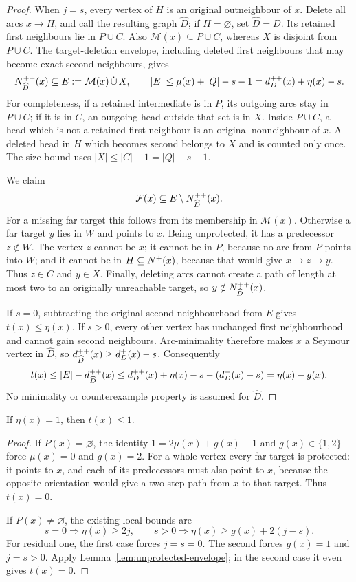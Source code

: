 \begin{proof}
When $j=s$, every vertex of $H$ is an original outneighbour of $x$.
Delete all arcs $x\to H$, and call the resulting graph $\widehat D$;
if $H=\varnothing$, set $\widehat D=D$. Its retained first neighbours
lie in $P\cup C$. Also
$\mathcal M(x)\subseteq P\cup C$, whereas $X$ is disjoint from $P\cup C$.
The target-deletion envelope, including deleted first neighbours that
may become exact second neighbours, gives
\[
 N^{++}_{\widehat D}(x)\subseteq
 E:=\mathcal M(x)\,\dot\cup\,X,
 \qquad
 |E|\le\mu(x)+|Q|-s-1
       =d^{++}_D(x)+\eta(x)-s.
\]
For completeness, if a retained intermediate is in $P$, its outgoing
arcs stay in $P\cup C$; if it is in $C$, an outgoing head outside that
set is in $X$. Inside $P\cup C$, a head which is not a retained first
neighbour is an original nonneighbour of $x$. A deleted head in $H$
which becomes second belongs to $X$ and is counted only once.
The size bound uses $|X|\le|C|-1=|Q|-s-1$.

We claim
\[
 \mathcal F(x)\subseteq E\setminus N^{++}_{\widehat D}(x).
\]
For a missing far target this follows from its membership in
$\mathcal M(x)$. Otherwise a far target $y$ lies in $W$ and points to
$x$. Being unprotected, it has a predecessor $z\notin W$.
The vertex $z$ cannot be $x$; it cannot be in $P$, because no arc from
$P$ points into $W$; and it cannot be in $H\subseteq N^+(x)$, because
that would give $x\to z\to y$. Thus $z\in C$ and $y\in X$.
Finally, deleting arcs cannot create a path of length at most two to
an originally unreachable target, so $y\notin N^{++}_{\widehat D}(x)$.

If $s=0$, subtracting the original second neighbourhood from $E$
gives $t(x)\le\eta(x)$. If $s>0$, every other vertex has unchanged
first neighbourhood and cannot gain second neighbours. Arc-minimality
therefore makes $x$ a Seymour vertex in $\widehat D$, so
$d^{++}_{\widehat D}(x)\ge d^+_D(x)-s$. Consequently
\[
 t(x)\le|E|-d^{++}_{\widehat D}(x)
 \le d^{++}_D(x)+\eta(x)-s-(d^+_D(x)-s)
 =\eta(x)-g(x).
\]
No minimality or counterexample property is assumed for $\widehat D$.
\end{proof}

\begin{corollary}\label{cor:eta-one-budget}
If $\eta(x)=1$, then $t(x)\le1$.
\end{corollary}
\begin{proof}
If $P(x)=\varnothing$, the identity
$1=2\mu(x)+g(x)-1$ and $g(x)\in\{1,2\}$ force
$\mu(x)=0$ and $g(x)=2$. For a whole vertex every far target is
protected: it points to $x$, and each of its predecessors must also
point to $x$, because the opposite orientation would give a two-step
path from $x$ to that target. Thus $t(x)=0$.

If $P(x)\ne\varnothing$, the existing local bounds are
\[
 s=0\Longrightarrow\eta(x)\ge2j,\qquad
 s>0\Longrightarrow\eta(x)\ge g(x)+2(j-s).
\]
For residual one, the first case forces $j=s=0$. The second forces
$g(x)=1$ and $j=s>0$. Apply
Lemma~\ref{lem:unprotected-envelope}; in the second case it even gives
$t(x)=0$.
\end{proof}

